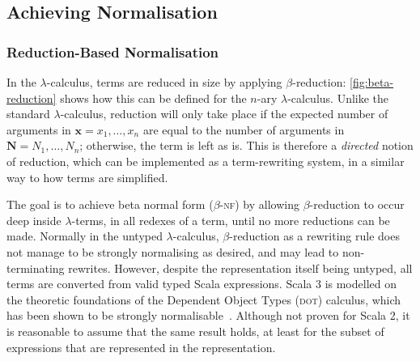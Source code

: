 \documentclass[../../main.tex]{subfiles}
\begin{document}
\subsection{Achieving Normalisation}\label{sec:normalisation-approach}

\subsubsection{Reduction-Based Normalisation}
In the $\lambda$-calculus, terms are reduced in size by applying $\beta$-reduction: \cref{fig:beta-reduction} shows how this can be defined for the $n$-ary $\lambda$-calculus.
Unlike the standard $\lambda$-calculus, reduction will only take place if the expected number of arguments in $\mathbf{x} = x_1, \ldots, x_n$ are equal to the number of arguments in $\mathbf{N} = N_1, \ldots, N_n$; otherwise, the term is left as is.
This is therefore a \emph{directed} notion of reduction, which can be implemented as a term-rewriting system, in a similar way to how  terms are simplified.

The goal is to achieve beta normal form ($\beta$-\textsc{nf}) by allowing $\beta$-reduction to occur deep inside $\lambda$-terms, in all redexes of a term, until no more reductions can be made.
Normally in the untyped $\lambda$-calculus, $\beta$-reduction as a rewriting rule does not manage to be strongly normalising as desired, and may lead to non-terminating rewrites.
However, despite the  representation itself being untyped, all  terms are converted from valid typed Scala expressions.
Scala 3 is modelled on the theoretic foundations of the Dependent Object Types (\textsc{dot}) calculus, which has been shown to be strongly normalisable~\cite{wang_strong_2017}.
Although not proven for Scala 2, it is reasonable to assume that the same result holds, at least for the subset of expressions that are represented in the  representation.
\end{document}
